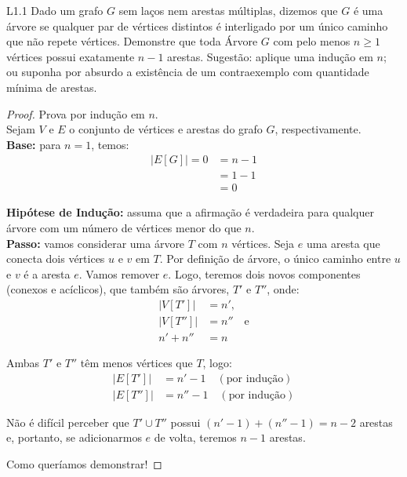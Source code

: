 \noindent L1.1 Dado um grafo $G$ sem laços nem arestas múltiplas, dizemos que $G$ é uma árvore se qualquer par de vértices distintos é interligado por um único caminho que não repete vértices. Demonstre que toda Árvore $G$ com pelo menos $n \geq 1$ vértices possui exatamente $n - 1$ arestas. Sugestão: aplique uma indução em $n$; ou suponha por absurdo a existência de um contraexemplo com quantidade mínima de arestas.

\begin{proof}
Prova por indução em $n$.\\

Sejam $V$ e $E$ o conjunto de vértices e arestas do grafo $G$, respectivamente.\\

\textbf{Base:} para $n = 1$, temos:
\begin{align*}
|E[G]| = 0 &= n - 1 \\
      &= 1 - 1 \\
      &= 0
\end{align*}

\textbf{Hipótese de Indução:} assuma que a afirmação é verdadeira para qualquer árvore com um número de vértices menor do que $n$.\\

\textbf{Passo:} vamos considerar uma árvore $T$ com $n$ vértices. Seja $e$ uma aresta que conecta dois vértices $u$ e $v$ em $T$. Por definição de árvore, o único caminho entre $u$ e $v$ é a aresta $e$. Vamos remover $e$. Logo, teremos dois novos componentes (conexos e acíclicos), que também são árvores, $T'$ e $T''$, onde:
\begin{align*}
|V[T']|  &= n'  \text{,}\\
|V[T'']| &= n'' \quad \text{e} \\
n' + n'' &= n
\end{align*}

Ambas $T'$ e $T''$ têm menos vértices que $T$, logo:
\begin{align*}
|E[T']|  &= n' - 1   \quad (\text{por indução}) \\
|E[T'']| &= n'' - 1 \quad (\text{por indução})
\end{align*}

Não é difícil perceber que $T' \cup T''$ possui $(n' - 1) + (n'' - 1) = n -2$ arestas e, portanto, se adicionarmos $e$ de volta, teremos $n - 1$ arestas.

Como queríamos demonstrar!

\end{proof}